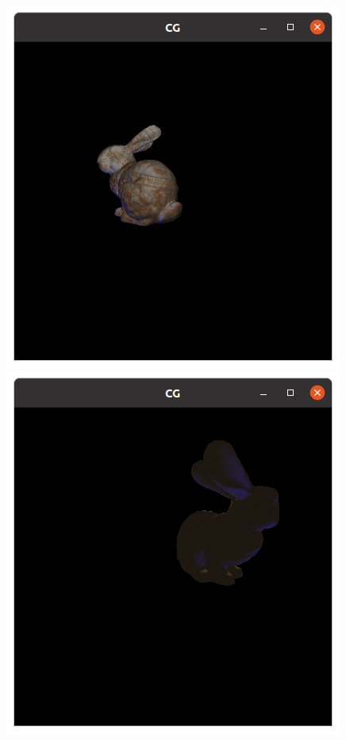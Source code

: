 \documentclass[12pt]{article}
\begin{document}
\begin{figure}[H]
\centering
\includegraphics[scale=0.4]{images/ej3.png}
\includegraphics[scale=0.4]{images/ej5.png}

\end{figure}
\end{document}
